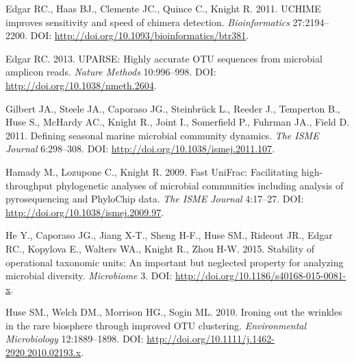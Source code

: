 \documentclass[11pt,]{article}
\begin{document}
Edgar RC., Haas BJ., Clemente JC., Quince C., Knight R. 2011. UCHIME
improves sensitivity and speed of chimera detection.
\emph{Bioinformatics} 27:2194--2200. DOI:
\url{http://doi.org/10.1093/bioinformatics/btr381}.

Edgar RC. 2013. UPARSE: Highly accurate OTU sequences from microbial
amplicon reads. \emph{Nature Methods} 10:996--998. DOI:
\url{http://doi.org/10.1038/nmeth.2604}.

Gilbert JA., Steele JA., Caporaso JG., Steinbrück L., Reeder J.,
Temperton B., Huse S., McHardy AC., Knight R., Joint I., Somerfield P.,
Fuhrman JA., Field D. 2011. Defining seasonal marine microbial community
dynamics. \emph{The ISME Journal} 6:298--308. DOI:
\url{http://doi.org/10.1038/ismej.2011.107}.

Hamady M., Lozupone C., Knight R. 2009. Fast UniFrac: Facilitating
high-throughput phylogenetic analyses of microbial communities including
analysis of pyrosequencing and PhyloChip data. \emph{The ISME Journal}
4:17--27. DOI: \url{http://doi.org/10.1038/ismej.2009.97}.

He Y., Caporaso JG., Jiang X-T., Sheng H-F., Huse SM., Rideout JR.,
Edgar RC., Kopylova E., Walters WA., Knight R., Zhou H-W. 2015.
Stability of operational taxonomic units: An important but neglected
property for analyzing microbial diversity. \emph{Microbiome} 3. DOI:
\url{http://doi.org/10.1186/s40168-015-0081-x}.

Huse SM., Welch DM., Morrison HG., Sogin ML. 2010. Ironing out the
wrinkles in the rare biosphere through improved OTU clustering.
\emph{Environmental Microbiology} 12:1889--1898. DOI:
\url{http://doi.org/10.1111/j.1462-2920.2010.02193.x}.
\end{document}
